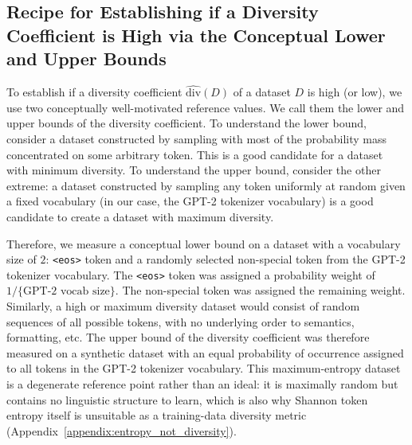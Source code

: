 \subsection{Recipe for Establishing if a Diversity Coefficient is High via the Conceptual Lower and Upper Bounds }\label{method_ub_lb}
To establish if a diversity coefficient $\hat{\textrm{div}}(D)$ of a dataset $D$ is high (or low), we use two conceptually well-motivated reference values.
We call them the lower and upper bounds of the diversity coefficient.
To understand the lower bound, consider a dataset constructed by sampling with most of the probability mass concentrated on some arbitrary token.
This is a good candidate for a dataset with minimum diversity.
To understand the upper bound, consider the other extreme: a dataset constructed by sampling any token uniformly at random given a fixed vocabulary (in our case, the GPT-2 tokenizer vocabulary) is a good candidate to create a dataset with maximum diversity.

Therefore, we measure a conceptual lower bound on a dataset with a vocabulary size of $2$: \texttt{<eos>} token and a randomly selected non-special token from the GPT-2 tokenizer vocabulary. 
The \texttt{<eos>} token was assigned a probability weight of $1/\{\text{GPT-2 vocab size}\}$. 
The non-special token was assigned the remaining weight.
Similarly, a high or maximum diversity dataset would consist of random sequences of all possible tokens, with no underlying order to semantics, formatting, etc.
The upper bound of the diversity coefficient was therefore measured on a synthetic dataset with an equal probability of occurrence assigned to all tokens in the GPT-2 tokenizer vocabulary.
This maximum-entropy dataset is a degenerate reference point rather than an ideal: it is maximally random but contains no linguistic structure to learn, which is also why Shannon token entropy itself is unsuitable as a training-data diversity metric (Appendix~\ref{appendix:entropy_not_diversity}).


